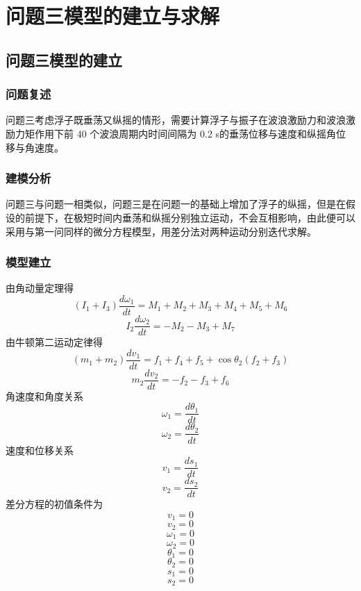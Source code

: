 \documentclass[a4paper,12pt]{article}
\begin{document}
	\section{问题三模型的建立与求解}
	\subsection{问题三模型的建立}
	\subsubsection{问题复述}
	问题三考虑浮子既垂荡又纵摇的情形，需要计算浮子与振子在波浪激励力和波浪激励力矩作用下前 40 个波浪周期内时间间隔为 0.2 s的垂荡位移与速度和纵摇角位移与角速度。
	\subsubsection{建模分析}
	问题三与问题一相类似，问题三是在问题一的基础上增加了浮子的纵摇，但是在假设的前提下，在极短时间内垂荡和纵摇分别独立运动，不会互相影响，由此便可以采用与第一问同样的微分方程模型，用差分法对两种运动分别迭代求解。
	\subsubsection{模型建立}
	由角动量定理得
	$$(I_1+I_3)\frac{d\omega_1}{dt}=M_1+M_2+M_3+M_4+M_5+M_6$$
	$$I_2\frac{d\omega_2}{dt}=-M_2-M_3+M_7$$
	由牛顿第二运动定律得
	$$(m_1+m_2)\frac{dv_1}{dt}=f_1+f_4+f_5+\cos\theta _2(f_2+f_3)$$
	$$m_2\frac{dv_2}{dt}=-f_2-f_3+f_6$$
	角速度和角度关系
	$$\omega_1=\frac{d\theta _1}{dt}$$
	$$\omega_2=\frac{d\theta _2}{dt}$$
	速度和位移关系
	$$v_1=\frac{ds_1}{dt}$$
	$$v_2=\frac{ds_2}{dt}$$
	差分方程的初值条件为
	$$v_1=0$$
	$$v_2=0$$
	$$\omega_1=0$$
	$$\omega_2=0$$
	$$\theta_1=0$$
	$$\theta_2=0$$
	$$s_1=0$$
	$$s_2=0$$
\end{document}
